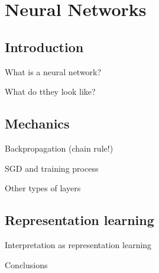 
\section{Neural Networks}
\subsection{Introduction}
\begin{frame}{What is a neural network?}

\end{frame}
\begin{frame}{What do tthey look like?}

\end{frame}
\subsection{Mechanics}
\begin{frame}{Backpropagation (chain rule!)}

\end{frame}
\begin{frame}{SGD and training process}

\end{frame}
\begin{frame}{Other types of layers}

\end{frame}
\subsection{Representation learning}
\begin{frame}{Interpretation as representation learning}

\end{frame}
\begin{frame}{Conclusions}

\end{frame}
